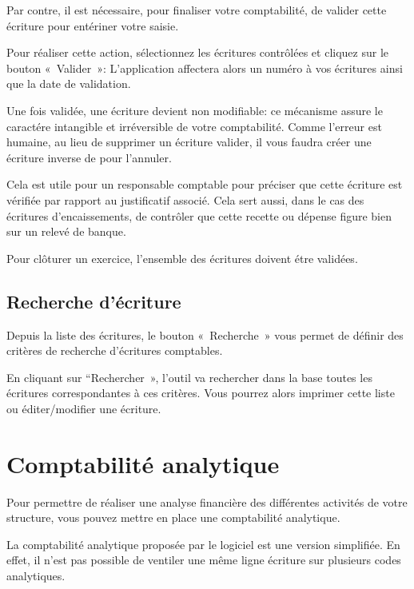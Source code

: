 \documentclass[a4paper,10pt,oneside,french]{sphinxmanual}
\begin{document}
Par contre, il est nécessaire, pour finaliser votre comptabilité, de valider cette
écriture pour entériner votre saisie.

Pour réaliser cette action, sélectionnez les écritures contrôlées et
cliquez sur le bouton « Valider »: L’application affectera alors un
numéro à vos écritures ainsi que la date de validation.

Une fois validée, une écriture devient non modifiable: ce mécanisme assure le
caractére intangible et irréversible de votre comptabilité.
Comme l’erreur est humaine, au lieu de supprimer un écriture valider, il vous faudra
créer une écriture inverse de pour l’annuler.

Cela est utile pour un responsable comptable pour préciser que cette
écriture est vérifiée par rapport au justificatif associé.
Cela sert aussi, dans le cas des écritures d’encaissements, de contrôler que
cette recette ou dépense figure bien sur un relevé de banque.

Pour clôturer un exercice, l’ensemble des écritures doivent étre validées.


\subsection{Recherche d’écriture}
\label{\detokenize{accounting/entity:recherche-d-ecriture}}
Depuis la liste des écritures, le bouton « Recherche » vous permet
de définir des critères de recherche d’écritures comptables.
\begin{quote}

\noindent{}
\end{quote}

En cliquant sur “Rechercher », l’outil va rechercher dans la base
toutes les écritures correspondantes à ces critères. Vous pourrez alors
imprimer cette liste ou éditer/modifier une écriture.


\section{Comptabilité analytique}
\label{\detokenize{accounting/costaccounting::doc}}\label{\detokenize{accounting/costaccounting:comptabilite-analytique}}
Pour permettre de réaliser une analyse financière des différentes activités de votre structure, vous pouvez mettre en place une comptabilité analytique.

La comptabilité analytique proposée par le logiciel est une version simplifiée.
En effet, il n’est pas possible de ventiler une même ligne écriture sur plusieurs codes analytiques.
\end{document}
